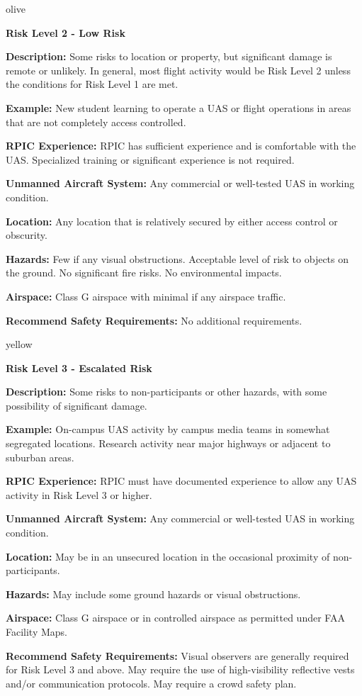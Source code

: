 \documentclass[
]{book}
\begin{document}
\begin{content-box}{olive}

\textbf{Risk Level 2 - Low Risk}

\textbf{Description:} Some risks to location or property, but significant damage is remote or unlikely. In general, most flight activity would be Risk Level 2 unless the conditions for Risk Level 1 are met.

\textbf{Example:} New student learning to operate a UAS or flight operations in areas that are not completely access controlled.

\textbf{RPIC Experience:} RPIC has sufficient experience and is comfortable with the UAS. Specialized training or significant experience is not required.

\textbf{Unmanned Aircraft System:} Any commercial or well-tested UAS in working condition.

\textbf{Location:} Any location that is relatively secured by either access control or obscurity.

\textbf{Hazards:} Few if any visual obstructions. Acceptable level of risk to objects on the ground. No significant fire risks. No environmental impacts.

\textbf{Airspace:} Class G airspace with minimal if any airspace traffic.

\textbf{Recommend Safety Requirements:} No additional requirements.

\end{content-box}

\begin{content-box}{yellow}

\textbf{Risk Level 3 - Escalated Risk}

\textbf{Description:} Some risks to non-participants or other hazards, with some possibility of significant damage.

\textbf{Example:} On-campus UAS activity by campus media teams in somewhat segregated locations. Research activity near major highways or adjacent to suburban areas.

\textbf{RPIC Experience:} RPIC must have documented experience to allow any UAS activity in Risk Level 3 or higher.

\textbf{Unmanned Aircraft System:} Any commercial or well-tested UAS in working condition.

\textbf{Location:} May be in an unsecured location in the occasional proximity of non-participants.

\textbf{Hazards:} May include some ground hazards or visual obstructions.

\textbf{Airspace:} Class G airspace or in controlled airspace as permitted under FAA Facility Maps.

\textbf{Recommend Safety Requirements:} Visual observers are generally required for Risk Level 3 and above. May require the use of high-visibility reflective vests and/or communication protocols. May require a crowd safety plan.

\end{content-box}
\end{document}
